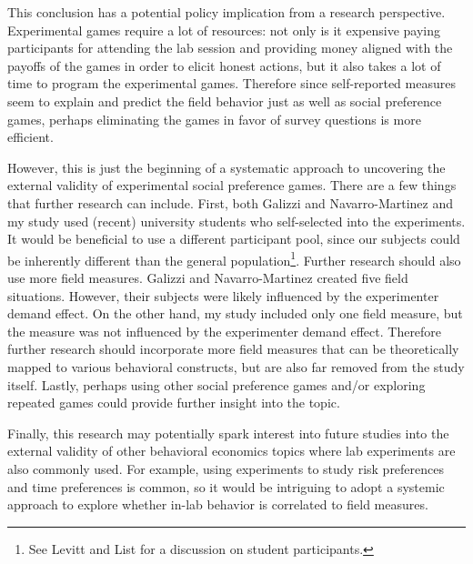 \documentclass[12pt]{article}
\begin{document}
This conclusion has a potential policy implication from a research perspective. Experimental games require a lot of resources: not only is it expensive paying participants for attending the lab session and providing money aligned with the payoffs of the games in order to elicit honest actions, but it also takes a lot of time to program the experimental games. Therefore since self-reported measures seem to explain and predict the field behavior just as well as social preference games, perhaps eliminating the games in favor of survey questions is more efficient.

However, this is just the beginning of a systematic approach to uncovering the external validity of experimental social preference games. There are a few things that further research can include. First, both Galizzi and Navarro-Martinez and my study used (recent) university students who self-selected into the experiments. It would be beneficial to use a different participant pool, since our subjects could be inherently different than the general population\footnote{See Levitt and List for a discussion on student participants.}. Further research should also use more field measures. Galizzi and Navarro-Martinez created five field situations. However, their subjects were likely influenced by the experimenter demand effect. On the other hand, my study included only one field measure, but the measure was not influenced by the experimenter demand effect. Therefore further research should incorporate more field measures that can be theoretically mapped to various behavioral constructs, but are also far removed from the study itself. Lastly, perhaps using other social preference games and/or exploring repeated games could provide further insight into the topic.

Finally, this research may potentially spark interest into future studies into the external validity of other behavioral economics topics where lab experiments are also commonly used. For example, using experiments to study risk preferences and time preferences is common, so it would be intriguing to adopt a systemic approach to explore whether in-lab behavior is correlated to field measures.





\newpage




%
\end{document}
